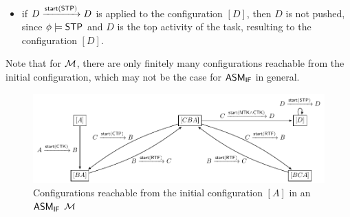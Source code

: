 \begin{example}
\begin{itemize}
	\item if $D \xrightarrow{{\mathsf{start} }({\sf STP})} D$ is applied to the configuration $[D]$, then $D$ is not pushed, since $\phi\models{\sf STP}$ and $D$ is the top activity of the task, resulting to the configuration $[D]$.
	\end{itemize}
	Note that for ${\mathcal{M} }$, there are only finitely many configurations reachable from the initial configuration, which may not be the case for $\textsf{ASM}_\textsf{IF}$ in general.  
		
	
		
	\begin{figure}
			\centering
			\includegraphics[scale = 0.75]{ifasm-example.pdf}
			\caption{Configurations reachable from the initial configuration $[A]$ in an $\textsf{ASM}_\textsf{IF}$ ${\mathcal{M} }$}
		\label{ifasm-example}
	\end{figure}
\end{example}

